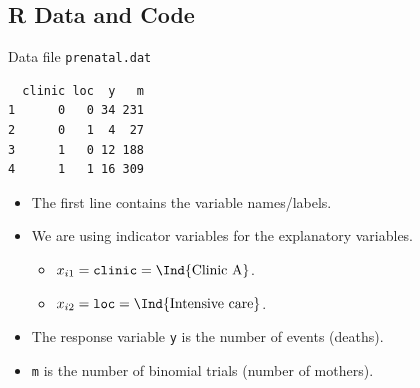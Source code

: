 \documentclass[oneside]{book}\usepackage[]{graphicx}\usepackage[svgnames]{xcolor}
\makeatletter
\newenvironment{kframe}{%
 \def\at@end@of@kframe{}%
 \ifinner\ifhmode%
  \def\at@end@of@kframe{\end{minipage}}%
  \begin{minipage}{\columnwidth}%
 \fi\fi%
 \def\FrameCommand##1{\hskip\@totalleftmargin \hskip-\fboxsep
 \colorbox{shadecolor}{##1}\hskip-\fboxsep
     \hskip-\linewidth \hskip-\@totalleftmargin \hskip\columnwidth}%
 \MakeFramed {\advance\hsize-\width
   \@totalleftmargin\z@ \linewidth\hsize
   \@setminipage}}%
 {\par\unskip\endMakeFramed%
 \at@end@of@kframe}
\newenvironment{knitrout}{}{} %
\makeatother
\begin{document}
\subsection*{R Data and Code}
\begin{Example}{Data file \texttt{prenatal.dat}}
\begin{knitrout}
\color{fgcolor}\begin{kframe}
\begin{verbatim}
  clinic loc  y   m
1      0   0 34 231
2      0   1  4  27
3      1   0 12 188
4      1   1 16 309
\end{verbatim}
\end{kframe}
\end{knitrout}
\end{Example}
\begin{itemize}
      \item The first line contains the variable names/labels.
      \item We are using indicator variables for the explanatory variables.
            \begin{itemize}
                  \item $ x_{i1}=\texttt{clinic}=\Ind{\text{Clinic A}} $.
                  \item $ x_{i2}=\texttt{loc}=\Ind{\text{Intensive care}} $.
            \end{itemize}
      \item The response variable \texttt{y} is the number of events (deaths).
      \item \texttt{m} is the number of binomial trials (number of mothers).
\end{itemize}
\end{document}
